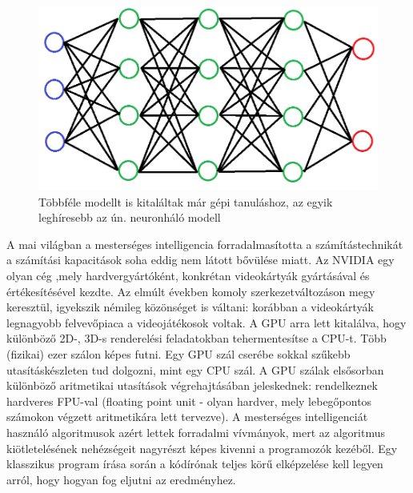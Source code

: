 \begin{figure}[ht!]
	\centering
	\includegraphics[width=150mm, keepaspectratio]{figures/neurons.png}
	\caption{Többféle modellt is kitaláltak már gépi tanuláshoz, az egyik leghíresebb az ún. neuronháló modell }
\end{figure}
A mai világban a mesterséges intelligencia forradalmasította a számítástechnikát a számítási kapacitások soha eddig nem látott bővülése miatt. Az NVIDIA egy olyan cég ,mely hardvergyártóként, konkrétan videokártyák gyártásával és értékesítésével kezdte. Az elmúlt években komoly szerkezetváltozáson megy keresztül, igyekszik némileg közönséget is váltani: korábban a videokártyák legnagyobb felvevőpiaca a videojátékosok voltak. A GPU arra lett kitalálva, hogy különböző 2D-, 3D-s renderelési feladatokban tehermentesítse a CPU-t. Több (fizikai) ezer szálon képes futni. Egy GPU szál cserébe sokkal szűkebb utasításkészleten tud dolgozni, mint egy CPU szál. A GPU szálak elsősorban különböző aritmetikai utasítások végrehajtásában jeleskednek: rendelkeznek hardveres FPU-val (floating point unit - olyan hardver, mely lebegőpontos számokon végzett aritmetikára lett tervezve). 
A mesterséges intelligenciát használó algoritmusok azért lettek forradalmi vívmányok, mert az algoritmus kiötletelésének nehézségeit nagyrészt képes kivenni a programozók kezéből. Egy klasszikus program írása során a kódírónak teljes körű elképzelése kell legyen arról, hogy hogyan fog eljutni az eredményhez. 



